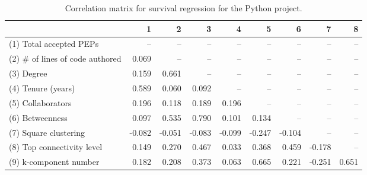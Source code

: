 \begin{table}[H]
\caption{Correlation matrix for survival regression for the Python project.}
\label{corr_table_survival}
\begin{center}
\begin{tabular}{lrrrrrrrr}
\toprule
{} &      1 &      2 &      3 &      4 &      5 &      6 &      7 &     8 \\
\midrule
(1) Total accepted PEPs         &    -- &    -- &    -- &    -- &    -- &    -- &    -- &   -- \\
(2) \# of lines of code authored &  0.069 &    -- &    -- &    -- &    -- &    -- &    -- &   -- \\
(3) Degree                      &  0.159 &  0.661 &    -- &    -- &    -- &    -- &    -- &   -- \\
(4) Tenure (years)              &  0.589 &  0.060 &  0.092 &    -- &    -- &    -- &    -- &   -- \\
(5) Collaborators               &  0.196 &  0.118 &  0.189 &  0.196 &    -- &    -- &    -- &   -- \\
(6) Betweenness                 &  0.097 &  0.535 &  0.790 &  0.101 &  0.134 &    -- &    -- &   -- \\
(7) Square clustering           & -0.082 & -0.051 & -0.083 & -0.099 & -0.247 & -0.104 &    -- &   -- \\
(8) Top connectivity level      &  0.149 &  0.270 &  0.467 &  0.033 &  0.368 &  0.459 & -0.178 &   -- \\
(9) k-component number          &  0.182 &  0.208 &  0.373 &  0.063 &  0.665 &  0.221 & -0.251 & 0.651 \\
\bottomrule
\end{tabular}
\end{center} 
\end{table}
